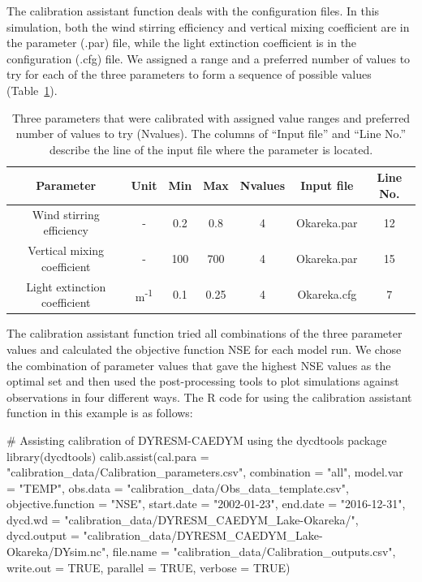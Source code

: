 The calibration assistant function deals with the configuration files. In this simulation, both the wind stirring efficiency and vertical mixing coefficient are in the parameter (.par) file, while the light extinction coefficient is in the configuration (.cfg) file. We assigned a range and a preferred number of values to try for each of the three parameters to form a sequence of possible values (Table~\ref{table2}). 

\begin{table}[htbp]
    \centering
    \caption{Three parameters that were calibrated with assigned value ranges and preferred number of values to try (N\textunderscore values). The columns of “Input file” and “Line No.” describe the line of the input file where the parameter is located.}
    \begin{tabular}{c c c c c c c }
    \toprule
    Parameter & Unit & Min & Max & N\textunderscore{}values & Input file & Line No.\\
    \midrule
    Wind stirring efficiency & - & 0.2 & 0.8 & 4 & Okareka.par & 12\\
    Vertical mixing coefficient & - & 100 & 700 & 4 & Okareka.par & 15\\
    Light extinction coefficient & m\textsuperscript{-1} & 0.1 & 0.25 & 4 & Okareka.cfg & 7\\
    \bottomrule
    \end{tabular}
    \label{table2}
\end{table}

The calibration assistant function tried all combinations of the three parameter values and calculated the objective function NSE for each model run. We chose the combination of parameter values that gave the highest NSE values as the optimal set and then used the post-processing tools to plot simulations against observations in four different ways. The R code for using the calibration assistant function in this example is as follows:

\begin{example}
   # Assisting calibration of DYRESM-CAEDYM using the dycdtools package
    library(dycdtools)
    calib.assist(cal.para = "calibration_data/Calibration_parameters.csv",
                 combination = "all",
                 model.var = "TEMP",
                 obs.data = "calibration_data/Obs_data_template.csv",
                 objective.function = "NSE",
                 start.date = "2002-01-23",
                 end.date = "2016-12-31",
                 dycd.wd = "calibration_data/DYRESM_CAEDYM_Lake-Okareka/",
                 dycd.output = "calibration_data/DYRESM_CAEDYM_Lake-Okareka/DYsim.nc",
                 file.name = "calibration_data/Calibration_outputs.csv",
                 write.out = TRUE,
                 parallel = TRUE,
                 verbose = TRUE)
\end{example}

